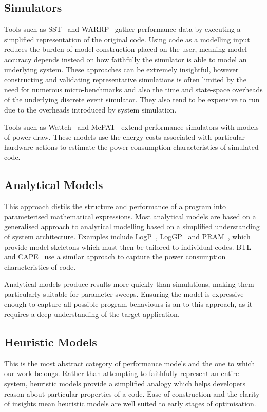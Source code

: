 \noindent
\subsection{Simulators} 
Tools such as SST~\cite{rodrigues:2011aa} and WARRP~\cite{hammond:2009aa} gather performance data by executing a simplified representation of the original code.
Using code as a modelling input reduces the burden of model construction placed on the user, meaning model accuracy depends instead on how faithfully the simulator is able to model an underlying system.
These approaches can be extremely insightful, however constructing and validating representative simulations is often limited by the need for numerous micro-benchmarks and also the time and state-space overheads of the underlying discrete event simulator.
They also tend to be expensive to run due to the overheads introduced by system simulation.

Tools such as Wattch~\cite{brooks:2000aa} and McPAT~\cite{li:2009aa} extend performance simulators with models of power draw.
These models use the energy costs associated with particular hardware actions to estimate the power consumption characteristics of simulated code.

\subsection{Analytical Models} This approach distils the structure and performance of a program into parameterised mathematical expressions.
Most analytical models are based on a generalised approach to analytical modelling based on a simplified understanding of system architecture.
Examples include LogP~\cite{culler:1993aa}, LogGP~\cite{alexandrov:1997aa} and PRAM~\cite{karp:1991aa}, which provide model skeletons which must then be tailored to individual codes.
BTL~\cite{manousakis:2012aa} and CAPE~\cite{kamble:1997aa} use a similar approach to capture the power consumption characteristics of code. 

Analytical models produce results more quickly than simulations, making them particularly suitable for parameter sweeps.
Ensuring the model is expressive enough to capture all possible program behaviours is an to this approach, as it requires a deep understanding of the target application.

\subsection{Heuristic Models}
This is the most abstract category of performance models and the one to which our work belongs.
Rather than attempting to faithfully represent an entire system, heuristic models provide a simplified analogy which helps developers reason about particular properties of a code.
Ease of construction and the clarity of insights mean heuristic models are well suited to early stages of optimisation.

